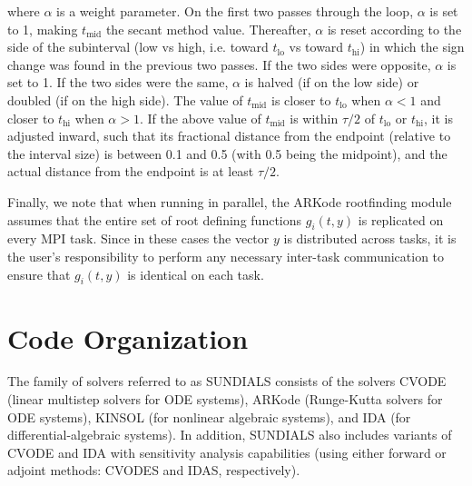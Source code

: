 \documentclass[letterpaper,10pt,english]{sphinxmanual}
\begin{document}
where $\alpha$ is a weight parameter. On the first two passes
through the loop, $\alpha$ is set to 1, making $t_\text{mid}$
the secant method value. Thereafter, $\alpha$ is reset according
to the side of the subinterval (low vs high, i.e. toward
$t_\text{lo}$ vs toward $t_\text{hi}$) in which the sign change was
found in the previous two passes. If the two sides were opposite,
$\alpha$ is set to 1. If the two sides were the same, $\alpha$
is halved (if on the low side) or doubled (if on the high side). The
value of $t_\text{mid}$ is closer to $t_\text{lo}$ when
$\alpha < 1$ and closer to $t_\text{hi}$ when $\alpha > 1$.
If the above value of $t_\text{mid}$ is within $\tau /2$ of
$t_\text{lo}$ or $t_\text{hi}$, it is adjusted inward, such that its
fractional distance from the endpoint (relative to the interval size)
is between 0.1 and 0.5 (with 0.5 being the midpoint), and the actual
distance from the endpoint is at least $\tau/2$.

Finally, we note that when running in parallel, the ARKode rootfinding
module assumes that the entire set of root defining functions
$g_i(t,y)$ is replicated on every MPI task.  Since in these
cases the vector $y$ is distributed across tasks, it is the
user's responsibility to perform any necessary inter-task
communication to ensure that $g_i(t,y)$ is identical on each task.


\chapter{Code Organization}
\label{Organization:organization}\label{Organization::doc}\label{Organization:code-organization}
The family of solvers referred to as SUNDIALS consists of the solvers
CVODE (linear multistep solvers for ODE systems), ARKode
(Runge-Kutta solvers for ODE systems), KINSOL (for nonlinear
algebraic systems), and IDA (for differential-algebraic systems).
In addition, SUNDIALS also includes variants of CVODE and
IDA with sensitivity analysis capabilities (using either forward
or adjoint methods: CVODES and IDAS, respectively).
\end{document}
